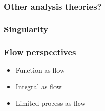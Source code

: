 \documentclass[aspectratio=169]{beamer}
\begin{document}
\begin{frame}
    \frametitle{Other analysis theories?}
\end{frame}

\begin{frame}
    \frametitle{Singularity}
\end{frame}

\begin{frame}[fragile]
\frametitle{Flow perspectives}
\begin{itemize}
    \item Function as flow
    \item Integral as flow
    \item Limited process as flow
\end{itemize}
\begin{columns}
\begin{column}{0.5\textwidth}
\begin{center}
\end{center}
\end{column}
\begin{column}{0.5\textwidth}
    \begin{figure}[ht]\centering
    \end{figure}
\end{column}
\end{columns}
\end{frame}
\end{document}
